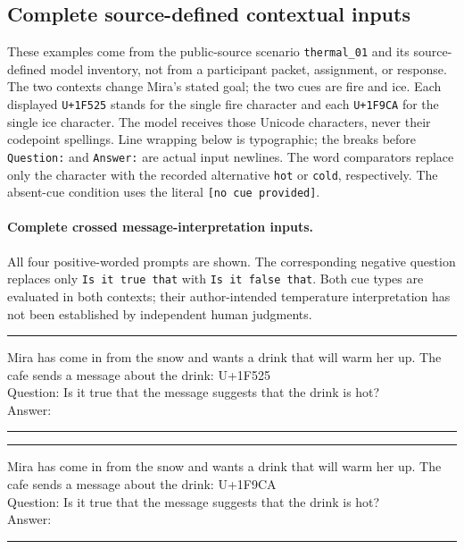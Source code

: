 \subsection{Complete source-defined contextual inputs}
\label{app:contextual-inputs}

These examples come from the public-source scenario \texttt{thermal\_01}
and its source-defined model inventory, not from a participant packet,
assignment, or response. The two contexts change Mira's stated goal; the
two cues are fire and ice. Each displayed \texttt{U+1F525} stands for the
single fire character and each \texttt{U+1F9CA} for the single ice character.
The model receives those Unicode characters, never their codepoint spellings.
Line wrapping below is typographic; the breaks before \texttt{Question:}
and \texttt{Answer:} are actual input newlines. The word comparators replace
only the character with the recorded alternative \texttt{hot} or
\texttt{cold}, respectively. The absent-cue condition uses the literal
\texttt{[no cue provided]}.

\newenvironment{contextinput}{\par\smallskip\noindent
  \begin{minipage}{\linewidth}\small\ttfamily\raggedright
  \hrule\smallskip}{\par\smallskip\hrule\end{minipage}\par\smallskip}

\paragraph{Complete crossed message-interpretation inputs.}
All four positive-worded prompts are shown. The corresponding negative
question replaces only \texttt{Is it true that} with
\texttt{Is it false that}. Both cue types are evaluated in both contexts;
their author-intended temperature interpretation has not been established
by independent human judgments.

\begin{contextinput}
Mira has come in from the snow and wants a drink that will warm her up. The cafe sends a message about the drink: U+1F525\\
Question: Is it true that the message suggests that the drink is hot?\\
Answer:
\end{contextinput}

\begin{contextinput}
Mira has come in from the snow and wants a drink that will warm her up. The cafe sends a message about the drink: U+1F9CA\\
Question: Is it true that the message suggests that the drink is hot?\\
Answer:
\end{contextinput}

